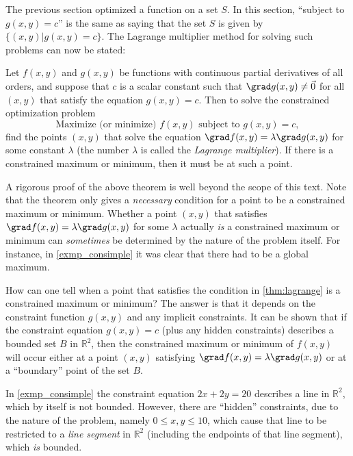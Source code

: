 The previous section optimized a function on a set $S$.  In this section, ``subject to $g(x,y)=c$'' is the same as saying that the set $S$ is given by $\{(x,y)|g(x,y)=c\}$. The Lagrange multiplier method for solving such problems can now be stated:

\begin{theorem}\label{thm:lagrange}
Let $f(x,y)$ and $g(x,y)$ be functions with continuous partial derivatives of all orders, and suppose that $c$ is a scalar constant such that $\grad g(x,y) \ne \vec0$ for all $(x,y)$ that satisfy the equation $g(x,y) = c$. Then to solve the constrained optimization problem
\[\text{Maximize (or minimize) }f(x,y)\text{ subject to }g(x,y) = c ,\]
find the points $(x,y)$ that solve the equation $\grad f(x,y) = \lambda \grad g(x,y)$ for some constant $\lambda$ (the number $\lambda$ is called the \emph{Lagrange multiplier}). If there is a constrained maximum or minimum, then it must be at such a point.
\end{theorem}

A rigorous proof of the above theorem is well beyond the scope of this text.
Note that the theorem only gives a \emph{necessary} condition for a point to be a constrained maximum or minimum. Whether a point $(x,y)$ that satisfies $\grad f(x,y) = \lambda \grad g(x,y)$ for some $\lambda$ actually \emph{is} a constrained maximum or minimum can \emph{sometimes} be determined by the nature of the problem itself. For instance, in \autoref{exmp_consimple} it was clear that there had to be a global maximum.

How can one tell when a point that satisfies the condition in \autoref{thm:lagrange} is a constrained maximum or minimum? The answer is that it depends on the constraint function $g(x,y)$ and any implicit constraints. It can be shown
that if the constraint equation $g(x,y)=c$ (plus any hidden constraints) describes a bounded set $B$ in $\mathbb{R}^2$, then the constrained maximum or minimum of $f(x,y)$ will occur either at a point $(x,y)$ satisfying $\grad f(x,y) = \lambda \grad g(x,y)$ or at a ``boundary'' point of the set $B$.


In \autoref{exmp_consimple} the constraint equation $2x+2y=20$ describes a line in $\mathbb{R}^2$, which by itself is not bounded. However, there are ``hidden'' constraints, due to the nature of the problem, namely $0\le x,y \le 10$, which cause that line to be restricted to a \emph{line segment} in $\mathbb{R}^2$ (including the endpoints of that line segment), which \emph{is} bounded.

